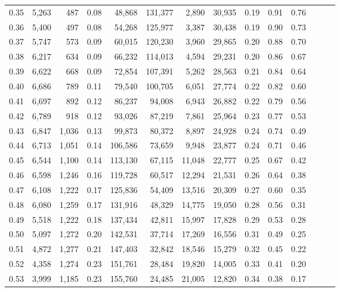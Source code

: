 \begin{tabular}{rrrrrrrrrrrrrr}
0.35 &  5,263 &    487 &  0.08 &   48,868 &  131,377 &   2,890 &  30,935 &  0.19 &  0.91 &      0.76 \\
0.36 &  5,400 &    497 &  0.08 &   54,268 &  125,977 &   3,387 &  30,438 &  0.19 &  0.90 &      0.73 \\
0.37 &  5,747 &    573 &  0.09 &   60,015 &  120,230 &   3,960 &  29,865 &  0.20 &  0.88 &      0.70 \\
0.38 &  6,217 &    634 &  0.09 &   66,232 &  114,013 &   4,594 &  29,231 &  0.20 &  0.86 &      0.67 \\
0.39 &  6,622 &    668 &  0.09 &   72,854 &  107,391 &   5,262 &  28,563 &  0.21 &  0.84 &      0.64 \\
0.40 &  6,686 &    789 &  0.11 &   79,540 &  100,705 &   6,051 &  27,774 &  0.22 &  0.82 &      0.60 \\
0.41 &  6,697 &    892 &  0.12 &   86,237 &   94,008 &   6,943 &  26,882 &  0.22 &  0.79 &      0.56 \\
0.42 &  6,789 &    918 &  0.12 &   93,026 &   87,219 &   7,861 &  25,964 &  0.23 &  0.77 &      0.53 \\
0.43 &  6,847 &  1,036 &  0.13 &   99,873 &   80,372 &   8,897 &  24,928 &  0.24 &  0.74 &      0.49 \\
0.44 &  6,713 &  1,051 &  0.14 &  106,586 &   73,659 &   9,948 &  23,877 &  0.24 &  0.71 &      0.46 \\
0.45 &  6,544 &  1,100 &  0.14 &  113,130 &   67,115 &  11,048 &  22,777 &  0.25 &  0.67 &      0.42 \\
0.46 &  6,598 &  1,246 &  0.16 &  119,728 &   60,517 &  12,294 &  21,531 &  0.26 &  0.64 &      0.38 \\
0.47 &  6,108 &  1,222 &  0.17 &  125,836 &   54,409 &  13,516 &  20,309 &  0.27 &  0.60 &      0.35 \\
0.48 &  6,080 &  1,259 &  0.17 &  131,916 &   48,329 &  14,775 &  19,050 &  0.28 &  0.56 &      0.31 \\
0.49 &  5,518 &  1,222 &  0.18 &  137,434 &   42,811 &  15,997 &  17,828 &  0.29 &  0.53 &      0.28 \\
0.50 &  5,097 &  1,272 &  0.20 &  142,531 &   37,714 &  17,269 &  16,556 &  0.31 &  0.49 &      0.25 \\
0.51 &  4,872 &  1,277 &  0.21 &  147,403 &   32,842 &  18,546 &  15,279 &  0.32 &  0.45 &      0.22 \\
0.52 &  4,358 &  1,274 &  0.23 &  151,761 &   28,484 &  19,820 &  14,005 &  0.33 &  0.41 &      0.20 \\
0.53 &  3,999 &  1,185 &  0.23 &  155,760 &   24,485 &  21,005 &  12,820 &  0.34 &  0.38 &      0.17 \\

\end{tabular}
